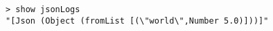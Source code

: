 \begin{repl}\begin{lstlisting}
> show jsonLogs
"[Json (Object (fromList [(\"world\",Number 5.0)]))]"\end{lstlisting}\end{repl}
